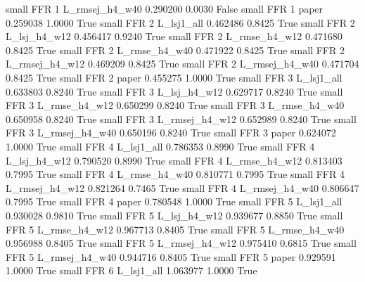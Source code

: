      small      FFR                 1 L_rmsej_h4_w40   0.290200      0.0030   False
     small      FFR                 1          paper   0.259038      1.0000    True
     small      FFR                 2     L_lsj1_all   0.462486      0.8425    True
     small      FFR                 2   L_lsj_h4_w12   0.456417      0.9240    True
     small      FFR                 2  L_rmse_h4_w12   0.471680      0.8425    True
     small      FFR                 2  L_rmse_h4_w40   0.471922      0.8425    True
     small      FFR                 2 L_rmsej_h4_w12   0.469209      0.8425    True
     small      FFR                 2 L_rmsej_h4_w40   0.471704      0.8425    True
     small      FFR                 2          paper   0.455275      1.0000    True
     small      FFR                 3     L_lsj1_all   0.633803      0.8240    True
     small      FFR                 3   L_lsj_h4_w12   0.629717      0.8240    True
     small      FFR                 3  L_rmse_h4_w12   0.650299      0.8240    True
     small      FFR                 3  L_rmse_h4_w40   0.650958      0.8240    True
     small      FFR                 3 L_rmsej_h4_w12   0.652989      0.8240    True
     small      FFR                 3 L_rmsej_h4_w40   0.650196      0.8240    True
     small      FFR                 3          paper   0.624072      1.0000    True
     small      FFR                 4     L_lsj1_all   0.786353      0.8990    True
     small      FFR                 4   L_lsj_h4_w12   0.790520      0.8990    True
     small      FFR                 4  L_rmse_h4_w12   0.813403      0.7995    True
     small      FFR                 4  L_rmse_h4_w40   0.810771      0.7995    True
     small      FFR                 4 L_rmsej_h4_w12   0.821264      0.7465    True
     small      FFR                 4 L_rmsej_h4_w40   0.806647      0.7995    True
     small      FFR                 4          paper   0.780548      1.0000    True
     small      FFR                 5     L_lsj1_all   0.930028      0.9810    True
     small      FFR                 5   L_lsj_h4_w12   0.939677      0.8850    True
     small      FFR                 5  L_rmse_h4_w12   0.967713      0.8405    True
     small      FFR                 5  L_rmse_h4_w40   0.956988      0.8405    True
     small      FFR                 5 L_rmsej_h4_w12   0.975410      0.6815    True
     small      FFR                 5 L_rmsej_h4_w40   0.944716      0.8405    True
     small      FFR                 5          paper   0.929591      1.0000    True
     small      FFR                 6     L_lsj1_all   1.063977      1.0000    True

